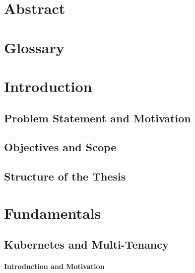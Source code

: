 \documentclass[11pt, a4paper, oneside, draft]{scrartcl}
\begin{document}
\begin{titlepage}
    \end{titlepage}

    \restoregeometry


    \section*{Abstract}

    \begingroup
        \tableofcontents
    \endgroup

    \section*{Glossary}


    \section{Introduction}

        \subsection{Problem Statement and Motivation}



        \subsection{Objectives and Scope}

        \subsection{Structure of the Thesis}

    \section{Fundamentals}

        \subsection{Kubernetes and Multi-Tenancy}

            \paragraph{Introduction and Motivation}
\end{document}

